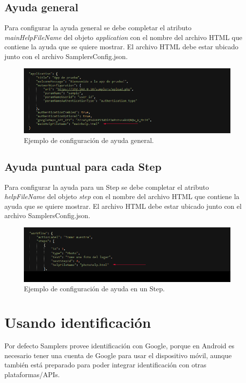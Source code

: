 \subsection{Ayuda general}
Para configurar la ayuda general se debe completar el atributo \textit{mainHelpFileName} del objeto \textit{application} con el nombre del archivo HTML que contiene la ayuda que se quiere mostrar. El archivo HTML debe estar ubicado junto con el archivo SamplersConfig.json.

\begin{figure}[H]
  \centering
    \includegraphics[scale=0.6]{50-anexos/B-uso/json_application_ayuda.png} 
    \caption{Ejemplo de configuración de ayuda general.}
\end{figure}	

\subsection{Ayuda puntual para cada Step}
Para configurar la ayuda para un Step se debe completar el atributo \textit{helpFileName} del objeto \textit{step} con el nombre del archivo HTML que contiene la ayuda que se quiere mostrar. El archivo HTML debe estar ubicado junto con el archivo SamplersConfig.json.

\begin{figure}[H]
  \centering
    \includegraphics[scale=0.6]{50-anexos/B-uso/json_step_ayuda.png} 
    \caption{Ejemplo de configuración de ayuda en un Step.}
\end{figure}	


\section{Usando identificación} \label{sec:usando_autenticacion}
Por defecto Samplers provee identificación con Google, porque en Android es necesario tener una cuenta de Google para usar el dispositivo móvil, aunque también está preparado para poder integrar identificación con otras plataformas/APIs.

